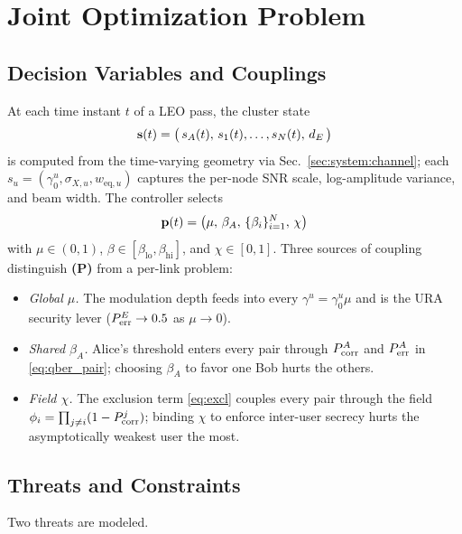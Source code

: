 \section{Joint Optimization Problem}\label{sec:formulation}

\subsection{Decision Variables and Couplings}

At each time instant $t$ of a LEO pass, the cluster state
\begin{equation}
  \mathbf{s}(t) = \big(\,s_A(t),\,s_1(t),\dots,s_N(t),\,d_E\,\big)
\end{equation}
is computed from the time-varying geometry via Sec.~\ref{sec:system:channel}; each $s_u = (\gamma_0^u, \sigma_{X,u}, w_{\mathrm{eq},u})$ captures the per-node SNR scale, log-amplitude variance, and beam width. The controller selects
\begin{equation}
  \mathbf{p}(t) = \big(\mu,\, \beta_A,\, \{\beta_i\}_{i=1}^N,\, \chi\big)
\end{equation}
with $\mu\in(0,1)$, $\beta\in[\beta_{\mathrm{lo}}, \beta_{\mathrm{hi}}]$, and $\chi\in[0,1]$. Three sources of coupling distinguish \textbf{(P)} from a per-link problem:
\begin{itemize}
\item \emph{Global $\mu$.} The modulation depth feeds into every $\gamma^u = \gamma_0^u \mu$ and is the URA security lever ($P_{\mathrm{err}}^E \to 0.5$ as $\mu\to 0$).
\item \emph{Shared $\beta_A$.} Alice's threshold enters every pair through $P_{\mathrm{corr}}^A$ and $P_{\mathrm{err}}^A$ in \eqref{eq:qber_pair}; choosing $\beta_A$ to favor one Bob hurts the others.
\item \emph{Field $\chi$.} The exclusion term \eqref{eq:excl} couples every pair through the field $\phi_i = \prod_{j\neq i}(1-P_{\mathrm{corr}}^j)$; binding $\chi$ to enforce inter-user secrecy hurts the asymptotically weakest user the most.
\end{itemize}

\subsection{Threats and Constraints}

Two threats are modeled.

